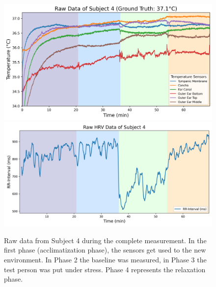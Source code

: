 \begin{figure}[!t]
    \centering
    \includegraphics[width=\textwidth]{thesis-doc/images/study2/p04/Logging_study2_p04_0smoothed_raw_data.png}
    \includegraphics[width=\textwidth]{thesis-doc/images/study2/p04/raw_hrv_data_participant_4.png}
    \caption{Raw data from Subject 4 during the complete measurement. In the first phase (acclimatization phase), the sensors get used to the new environment. In Phase 2 the baseline was measured, in Phase 3 the test person was put under stress. Phase 4 represents the relaxation phase.}
    \label{fig:ch:Evaluation:Study2:RawData}
\end{figure}

